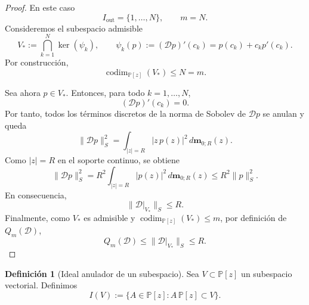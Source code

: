 \documentclass[12pt,a4paper]{article}
\theoremstyle{definition}
\newtheorem{definition}{Definición}
\theoremstyle{remark}
\newcommand{\Poly}{\mathbb{P}[z]}
\newcommand{\D}{\mathcal{D}}
\begin{document}
\begin{proof}
  En este caso
  \[
    I_{\mathrm{out}}=\{1,\dots,N\},
    \qquad
    m=N.
  \]
  Consideremos el subespacio admisible
  \[
    V_*:=\bigcap_{k=1}^N \ker(\psi_k),
    \qquad
    \psi_k(p):=(\D p)'(c_k)=p(c_k)+c_kp'(c_k).
  \]
  Por construcción,
  \[
    \operatorname{codim}_{\Poly}(V_*)\le N=m.
  \]

  Sea ahora $p\in V_*$. Entonces, para todo $k=1,\dots,N$,
  \[
    (\D p)'(c_k)=0.
  \]
  Por tanto, todos los términos discretos de la norma de Sobolev de $\D p$ se anulan y queda
  \[
    \|\D p\|_S^2
    =
    \int_{|z|=R} |z\,p(z)|^2\,d\mathbf{m}_{0;R}(z).
  \]
  Como $|z|=R$ en el soporte continuo, se obtiene
  \[
    \|\D p\|_S^2
    =
    R^2\int_{|z|=R}|p(z)|^2\,d\mathbf{m}_{0;R}(z)
    \le
    R^2\|p\|_S^2.
  \]
  En consecuencia,
  \[
    \|\D|_{V_*}\|_S\le R.
  \]
  Finalmente, como $V_*$ es admisible y $\operatorname{codim}_{\Poly}(V_*)\le m$, por definición de $Q_m(\D)$,
  \[
    Q_m(\D)\le \|\D|_{V_*}\|_S\le R.
  \]
\end{proof}

\begin{definition}[Ideal anulador de un subespacio]
  Sea $V\subset \Poly$ un subespacio vectorial. Definimos
  \[
    I(V):=\{A\in \Poly: A\,\Poly\subset V\}.
  \]
\end{definition}
\end{document}
